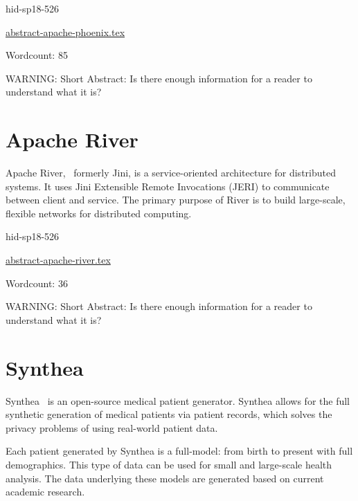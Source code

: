 \begin{IU}

hid-sp18-526

\href{https://github.com/cloudmesh-community/hid-sp18-526/blob/master//technology/abstract-apache-phoenix.tex}{abstract-apache-phoenix.tex}

 

Wordcount: 85

WARNING: Short Abstract: Is there enough information for a reader to understand what it is?

\end{IU}

\section{Apache River}

Apache River,~\cite{hid-sp18-www-526-apache-river} formerly
Jini, is a service-oriented architecture for distributed
systems. It uses Jini Extensible Remote Invocations (JERI)
to communicate between client and service. The primary 
purpose of River is to build large-scale, flexible networks
for distributed computing.



\begin{IU}

hid-sp18-526

\href{https://github.com/cloudmesh-community/hid-sp18-526/blob/master//technology/abstract-apache-river.tex}{abstract-apache-river.tex}

 

Wordcount: 36

WARNING: Short Abstract: Is there enough information for a reader to understand what it is?

\end{IU}

\section{Synthea}

Synthea~\cite{hid-sp18-526-www-synthea} is an open-source
medical patient generator. Synthea allows for the full synthetic
generation of medical patients via patient records, which solves
the privacy problems of using real-world patient data.

Each patient generated by Synthea is a full-model: from birth
to present with full demographics. This type of data can be used
for small and large-scale health analysis. The data underlying
these models are generated based on current academic research.


